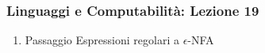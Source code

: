 




\begin{frame}[fragile]
	\frametitle{Linguaggi e Computabilità: Lezione 19}
\begin{enumerate}
\item
Passaggio Espressioni regolari a $\epsilon$-NFA
\end{enumerate}
\end{frame}



